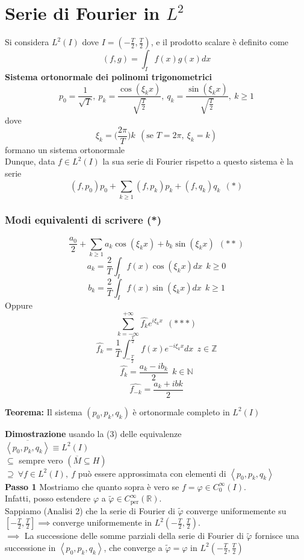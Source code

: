 \documentclass[a4paper]{article}
\newcommand{\R}{\mathbb{R}}
\newcommand{\N}{\mathbb{N}}
\newcommand{\Z}{\mathbb{Z}}
\begin{document}
\section{Serie di Fourier in $L^2$}
Si considera $L^{2}(I)$ dove $I=(-\frac{T}{2},\frac{T}{2})$, e il prodotto scalare è definito come
\[(f,g)=\int_{I}^{} f(x)g(x)dx\]
\textbf{Sistema ortonormale dei polinomi trigonometrici}
\[p_0=\frac{1}{\sqrt{T} },\ p_k=\frac{\cos(\xi_kx)}{\sqrt{\frac{T}{2}} },\ q_k= \frac{\sin(\xi_kx)}{\sqrt{\frac{T}{2}} },\ k\ge 1\]
dove 
\[\xi_k=\bigg(\frac{2\pi}{T}\bigg)k\ \ (\text{se }T=2\pi,\ \xi_k=k)\]
formano un sistema ortonormale
\\Dunque, data $f\in L^{2}(I)$ la sua serie di Fourier rispetto a questo sistema è la serie
\[(f,p_0)p_0+\sum_{k\ge 1}^{} (f,p_k)p_k+(f,q_k)q_k\ \ (*)\]
\subsubsection{Modi equivalenti di scrivere (*)}
\[\frac{a_0}{2}+\sum_{k\ge 1}^{} a_k\cos(\xi_kx)+b_k\sin(\xi_kx)\ \ (* *)\]
\[a_k=\frac{2}{T}\int_{I}^{} f(x)\cos(\xi_kx)dx\ \ k\ge 0\]
\[b_k=\frac{2}{T}\int_{I}^{} f(x)\sin(\xi_kx)dx\ \ k\ge 1\]
Oppure 
\[\sum_{k=-\infty}^{+\infty} \hat{f_k}e^{i\xi_kx}\ \ (* * *)\]
\[\hat{f_k}=\frac{1}{T}\int_{-\frac{T}{2}}^{\frac{T}{2}} f(x)e^{-i\xi_kx}dx\ \ z\in \Z\]
\[\hat{f_k}= \frac{a_k-ib_k}{2}\ \ k\in \N\]
\[\hat{f_{-k}}=\frac{a_k+ibk}{2} \]
\begin{tcolorbox}
	\textbf{Teorema: }Il sistema $(p_0,p_k,q_k)$ è ortonormale completo in $L^{2}(I)$
\end{tcolorbox}
\textbf{Dimostrazione} usando la (3) delle equivalenze
\\$\overline{\left< p_0,p_k,q_k \right> }\equiv L^{2}(I)$ 
\\$\subseteq  $ sempre vero $(\overline{M}\subseteq  H)$ 
\\$\supseteq \ \forall f\in L^{2}(I),\ f$ può essere approssimata con elementi di $\left< p_0,p_k,q_k \right> $
\\\textbf{Passo 1} Mostriamo che quanto sopra è vero se $f=\varphi\in C_0^\infty(I)$.
\\Infatti, posso estendere $\varphi$ a $\tilde\varphi\in C_{\text{per}}^\infty(\R)$.
\\Sappiamo (Analisi 2) che la serie di Fourier di $\tilde\varphi$ converge uniformemente su $[-\frac{T}{2},\frac{T}{2}]\implies $converge uniformemente in $L^{2}(-\frac{T}{2},\frac{T}{2})$.
\\$\implies $ La successione delle somme parziali della serie di Fourier di $\tilde\varphi$ fornisce una successione in $\left< p_0,p_k,q_k \right> $, che converge a $\tilde\varphi=\varphi$ in $L^{2}(-\frac{T}{2},\frac{T}{2})$
\end{document}
